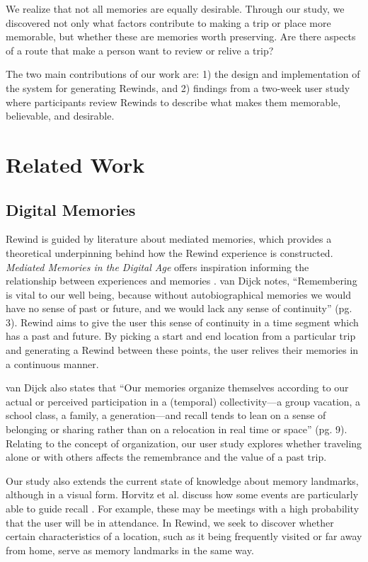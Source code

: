 \documentclass{sigchi}
\begin{document}
We realize that not all memories are equally desirable. Through our study, we discovered not only what factors contribute to making a trip or place more memorable, but whether these are memories worth preserving. Are there aspects of a route that make a person want to review or relive a trip?
 
The two main contributions of our work are: 1) the design and implementation of the system for generating Rewinds, and 2) findings from a two-week user study where participants review Rewinds to describe what makes them memorable, believable, and desirable.

\section{Related Work}
\subsection{Digital Memories}
Rewind is guided by literature about mediated memories, which provides a theoretical underpinning behind how the Rewind experience is constructed. \textit{Mediated Memories in the Digital Age} offers inspiration informing the relationship between experiences and memories \cite{van2007mediated}. van Dijck notes, ``Remembering is vital to our well being, because without autobiographical memories we would have no sense of past or future, and we would lack any sense of continuity'' (pg. 3). Rewind aims to give the user this sense of continuity in a time segment which has a past and future. By picking a start and end location from a particular trip and generating a Rewind between these points, the user relives their memories in a continuous manner.

van Dijck also states that ``Our memories organize themselves according to our actual or perceived participation in a (temporal) collectivity---a group vacation, a school class, a family, a generation---and recall tends to lean on a sense of belonging or sharing rather than on a relocation in real time or space'' (pg. 9). Relating to the concept of organization, our user study explores whether traveling alone or with others affects the remembrance and the value of a past trip. 

Our study also extends the current state of knowledge about memory landmarks, although in a visual form. Horvitz et al. discuss how some events are particularly able to guide recall \cite{horvitz2004learning}. For example, these may be meetings with a high probability that the user will be in attendance. In Rewind, we seek to discover whether certain characteristics of a location, such as it being frequently visited or far away from home, serve as memory landmarks in the same way.
\end{document}
